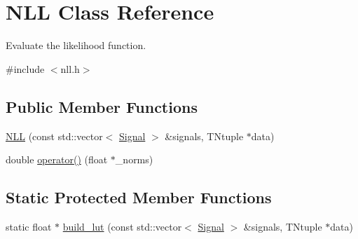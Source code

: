 \hypertarget{classNLL}{
\section{NLL Class Reference}
\label{classNLL}
}


Evaluate the likelihood function.  




{\ttfamily \#include $<$nll.h$>$}

\subsection*{Public Member Functions}
\begin{DoxyCompactItemize}
\item 
\hyperlink{classNLL_a55bf637cd44c2909738f39136b554f7d}{NLL} (const std::vector$<$ \hyperlink{structSignal}{Signal} $>$ \&signals, TNtuple $\ast$data)
\item 
double \hyperlink{classNLL_a2184173a58f1f0378bf9fb48815f903b}{operator()} (float $\ast$\_\-norms)
\end{DoxyCompactItemize}
\subsection*{Static Protected Member Functions}
\begin{DoxyCompactItemize}
\item 
static float $\ast$ \hyperlink{classNLL_aba6f617341942f985efba25f5c34f18f}{build\_\-lut} (const std::vector$<$ \hyperlink{structSignal}{Signal} $>$ \&signals, TNtuple $\ast$data)
\end{DoxyCompactItemize}

